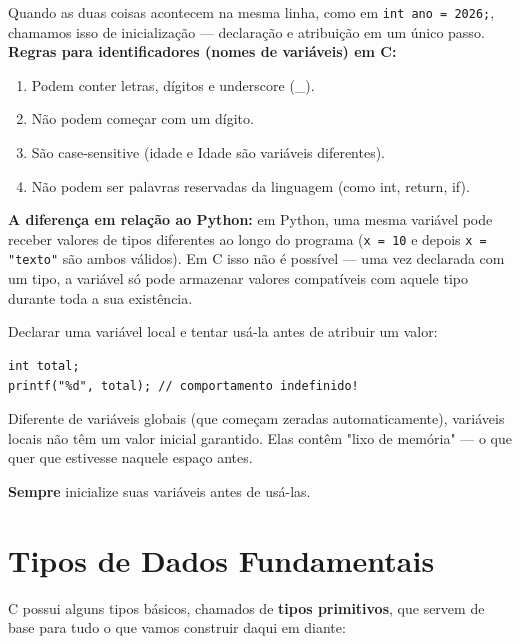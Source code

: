 \documentclass[12pt,a4paper,oneside]{extreport}
\begin{document}
Quando as duas coisas acontecem na mesma linha, como em \texttt{int ano = 2026;}, chamamos isso de inicialização — declaração e atribuição em um único passo. \\

\textbf{Regras para identificadores (nomes de variáveis) em C:}

\begin{enumerate}
    \item Podem conter letras, dígitos e underscore (\_).
    \item Não podem começar com um dígito.
    \item São case-sensitive (idade e Idade são variáveis diferentes).
    \item Não podem ser palavras reservadas da linguagem (como int, return, if).
\end{enumerate}

\textbf{A diferença em relação ao Python:} 
em Python, uma mesma variável pode receber valores de tipos diferentes ao longo do programa (\texttt{x = 10} e depois \texttt{x = "texto"} são ambos válidos). Em C isso não é possível — uma vez declarada com um tipo, a variável só pode armazenar valores compatíveis com aquele tipo durante toda a sua existência.


\begin{errocomum}

Declarar uma variável local e tentar usá-la antes de atribuir um valor:

\begin{lstlisting}
int total;
printf("%d", total); // comportamento indefinido!

\end{lstlisting}

Diferente de variáveis globais (que começam zeradas automaticamente), variáveis locais não têm um valor inicial garantido. Elas contêm "lixo de memória" — o que quer que estivesse naquele espaço antes. 

\textbf{Sempre} inicialize suas variáveis antes de usá-las.

    
\end{errocomum}



\section{Tipos de Dados Fundamentais}
C possui alguns tipos básicos, chamados de \textbf{tipos primitivos}, que servem de base para tudo o que vamos construir daqui em diante:
\end{document}
